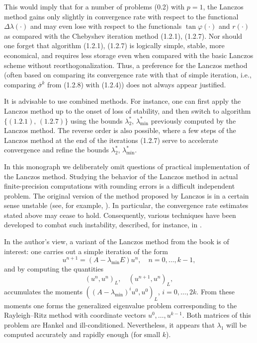 \documentclass[11pt,oneside]{book}
\begin{document}
This would imply that for a number of problems (0.2) with $p = 1$, the Lanczos method gains only slightly in convergence rate with respect to the functional $\Delta\lambda(\cdot)$ and may even lose with respect to the functionals $\tan\varphi(\cdot)$ and $r(\cdot)$ as compared with the Chebyshev iteration method (1.2.1), (1.2.7). Nor should one forget that algorithm (1.2.1), (1.2.7) is logically simple, stable, more economical, and requires less storage even when compared with the basic Lanczos scheme without reorthogonalization. Thus, a preference for the Lanczos method (often based on comparing its convergence rate with that of simple iteration, i.e., comparing $\bar{\sigma}^k$ from (1.2.8) with (1.2.4)) does not always appear justified.

It is advisable to use combined methods. For instance, one can first apply the Lanczos method up to the onset of loss of stability, and then switch to algorithm $\{(1.2.1),\,(1.2.7)\}$ using the bounds $\lambda_2^*$, $\lambda_{\min}^*$ previously computed by the Lanczos method. The reverse order is also possible, where a few steps of the Lanczos method at the end of the iterations (1.2.7) serve to accelerate convergence and refine the bounds $\lambda_2^*$, $\lambda_{\min}^*$.

In this monograph we deliberately omit questions of practical implementation of the Lanczos method. Studying the behavior of the Lanczos method in actual finite-precision computations with rounding errors is a difficult independent problem. The original version of the method proposed by Lanczos is in a certain sense unstable (see, for example, \citep{Parlett1983,Ikramov1982}). In particular, the convergence rate estimates stated above may cease to hold. Consequently, various techniques have been developed to combat such instability, described, for instance, in \citep{CullumWilloughby1985}.

In the author's view, a variant of the Lanczos method from the book \citep{FaddeevFaddeeva1963} is of interest: one carries out a simple iteration of the form
\[
u^{n+1} = (A - \lambda_{\min} E) u^n, \quad n = 0, \ldots, k - 1,
\]
and by computing the quantities
\[
(u^n, u^n)_L, \quad (u^{n+1}, u^n)_L,
\]
accumulates the moments $((A - \lambda_{\min})^i u^0, u^0)_L$, $i = 0, \ldots, 2k$. From these moments one forms the generalized eigenvalue problem corresponding to the Rayleigh--Ritz method with coordinate vectors $u^0, \ldots, u^{k-1}$. Both matrices of this problem are Hankel and ill-conditioned. Nevertheless, it appears that $\lambda_1$ will be computed accurately and rapidly enough (for small $k$).
\end{document}
